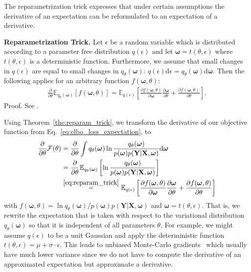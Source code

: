 \documentclass[runningheads]{llncs}
\begin{document}
The reparametrization trick expresses that under certain assumptions the derivative of an expectation can be reformulated to an expectation of a derivative. 

\begin{theorem}
\label{the:reparam_trick}
\textbf{Reparametrization Trick.} Let $\epsilon$ be a random variable which is distributed according to a parameter free distribution $q(\epsilon)$ and let $\boldsymbol{\omega} = t(\theta, \epsilon)$ where $t(\theta, \epsilon)$ is a deterministic function. Furthermore, we assume that small changes in $q(\epsilon)$ are equal to small changes in $q_\theta(\boldsymbol{\omega})$: $q(\epsilon)\mathrm{d}\epsilon = q_\theta(\boldsymbol{\omega})\mathrm{d}\boldsymbol{\omega}$.
Then the following applies for an arbitrary function $f(\boldsymbol{\omega}, \theta)$:
\begin{align}
\frac{\partial}{\partial\theta} \mathbb{E}_{q_\theta(\boldsymbol{\omega})} \left[f(\boldsymbol{\omega}, \theta)\right]= 
\mathbb{E}_{q(\epsilon)}\left[ \frac{\partial f(\boldsymbol{\omega}, \theta)}{\partial\boldsymbol{\omega}}\frac{\partial\boldsymbol{\omega}}{\partial\theta} + \frac{\partial f(\boldsymbol{\omega}, \theta)}{\partial \theta}\right].\label{eq:reparam_trick}
\end{align}
Proof. See \cite{BlundellBBB}.
\end{theorem}
Using Theorem~\ref{the:reparam_trick}, we transform the derivative of our objective function from Eq.~\ref{eq:elbo_loss_expectation}, to
\begin{align}
    \frac{\partial}{\partial\theta}\mathcal{F}(\theta) &= \frac{\partial}{\partial\theta}\int q_\theta(\boldsymbol{\omega}) \ln \frac{q_\theta(\boldsymbol{\omega})}{p(\boldsymbol{\omega})p(\mathbf{Y} | \mathbf{X}, \boldsymbol{\omega})}\mathrm{d}\boldsymbol{\omega} \\
    &= \frac{\partial}{\partial\theta}\mathbb{E}_{q_\theta(\boldsymbol{\omega})}\left[ \ln \frac{q_\theta(\boldsymbol{\omega})}{p(\boldsymbol{\omega})p(\mathbf{Y} | \mathbf{X}, \boldsymbol{\omega})} \right]\label{eq:applied_reparam} \\
    &\overset{\eqref{eq:reparam_trick}}{=}
    \mathbb{E}_{q(\epsilon)}\left[ \frac{\partial f(\boldsymbol{\omega}, \theta)}{\partial\boldsymbol{\omega}}\frac{\partial\boldsymbol{\omega}}{\partial\theta} + \frac{\partial f(\boldsymbol{\omega}, \theta)}{\partial \theta} \right]
    \label{eq:elbo_bayes_by_backprop}
\end{align}
with $f(\boldsymbol{\omega}, \theta) = \ln q_\theta(\boldsymbol{\omega}) / p(\boldsymbol{\omega})p(\mathbf{Y} | \mathbf{X}, \boldsymbol{\omega})$ and $\boldsymbol{\omega} = t(\theta, \epsilon)$.
That is, we rewrite the expectation that is taken with respect to the variational distribution $q_\theta(\boldsymbol{\omega})$ so that it is independent of all parameters $\theta$.
For example, we might assume $q(\epsilon)$ to be a unit Gaussian and apply the deterministic function $t(\theta, \epsilon) = \mu + \sigma \cdot \epsilon$.
This leads to unbiased Monte-Carlo gradients~\cite{BlundellBBB} which usually have much lower variance since we do not have to compute the derivative of an approximated expectation but approximate a derivative.
\end{document}
